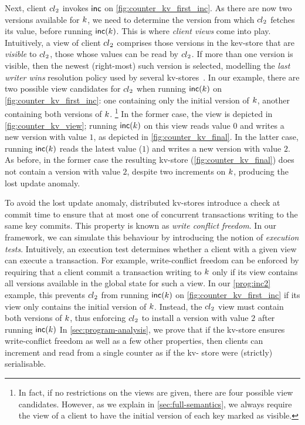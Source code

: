 Next, client ${cl}_2$ invokes $\mathsf{inc}$ on \cref{fig:counter_kv_first_inc}. 
As there are now two versions available for $k$, 
we need to determine the version from which ${cl}_2$ fetches its value, before running $\mathsf{inc}(k)$.
This is where \emph{client views} come into play.
Intuitively, a view of client ${cl}_2$ comprises those versions in the kev-store that are \emph{visible} to ${cl}_2$, 
\ie those whose values can be read by ${cl}_2$. 
If more than one version is visible, then the newest (right-most) such version is selected, 
modelling the \emph{last writer wins} resolution policy used by several kv-stores~\cite{vogels:2009:ec:1435417.1435432}. 
In our example, there are two possible view candidates for ${cl}_2$ when running $\mathsf{inc}(k)$ on \cref{fig:counter_kv_first_inc}: 
one containing only the initial version of $k$, 
another containing both versions of $k$.%
\footnote{In fact, if no restrictions on the views are given, there 
are four possible view candidates. 
However, as we explain in \cref{sec:full-semantics}, we always require the view of a client 
to have the initial version of each key marked as visible.}
In the former case, the view is depicted in \cref{fig:counter_kv_view};
running $\mathsf{inc}(k)$ on this view reads value $0$ and writes a new version with value $1$, as depicted in \cref{fig:counter_kv_final}.
In the latter case, running $\mathsf{inc}(k)$ reads the latest value ($1$) and writes a new version with value $2$.
As before, in the former case the resulting kv-store (\cref{fig:counter_kv_final}) does not contain a version with value $2$, despite two increments on $k$, producing the lost update anomaly.

To avoid the lost update anomaly, distributed kv-stores introduce a check at commit time to ensure that 
at most one of concurrent transactions writing to the same key commits. 
This property is known as \emph{write conflict freedom}. 
In our framework, we can simulate this behaviour by introducing the notion of \emph{execution tests}. 
Intuitively, an execution test determines whether a client with a given view can execute a transaction. 
For example, write-conflict freedom can be enforced by requiring that a client commit a transaction writing to $k$ 
only if its view contains all versions available in the global state for such a view. 
In our \eqref{prog:inc2} example, this prevents ${cl}_2$ from running $\mathsf{inc}(k)$ on \cref{fig:counter_kv_first_inc}
if its view only contains the initial version of $k$. 
Instead, the ${cl}_2$ view must contain both versions of $k$, 
thus enforcing ${cl}_2$ to install a version with value $2$ after running $\mathsf{inc}(k)$
In \cref{sec:program-analysis}, we prove that if the kv-store 
ensures write-conflict freedom as well as a few other properties, then clients can increment 
and read from a single counter as if the kv- store were (strictly) serialisable.

